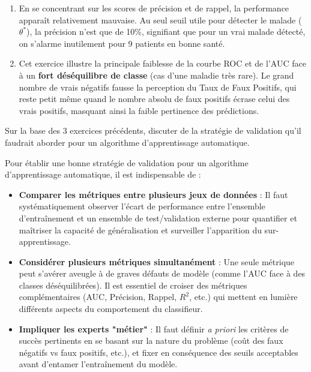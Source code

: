 \documentclass[]{../exercices}
\begin{document}
\begin{solution}
\begin{enumerate}
		\item En se concentrant sur les scores de précision et de rappel, la performance apparaît relativement mauvaise. Au seul seuil utile pour détecter le malade ($\theta^*$), la précision n'est que de 10\%, signifiant que pour un vrai malade détecté, on s'alarme inutilement pour 9 patients en bonne santé.

		\item Cet exercice illustre la principale faiblesse de la courbe ROC et de l'AUC face à un \textbf{fort déséquilibre de classe} (cas d'une maladie très rare). Le grand nombre de vrais négatifs fausse la perception du Taux de Faux Positifs, qui reste petit même quand le nombre absolu de faux positifs écrase celui des vrais positifs, masquant ainsi la faible pertinence des prédictions.
	\end{enumerate}
\end{solution}

	\begin{exercice}
		Sur la base des 3 exercices précédents, discuter de la stratégie de validation qu'il faudrait aborder pour un algorithme d'apprentissage automatique.
	\end{exercice}

\begin{solution}
	Pour établir une bonne stratégie de validation pour un algorithme d'apprentissage automatique, il est indispensable de :
	\begin{itemize}
		\item \textbf{Comparer les métriques entre plusieurs jeux de données} : Il faut systématiquement observer l'écart de performance entre l'ensemble d'entraînement et un ensemble de test/validation externe pour quantifier et maîtriser la capacité de généralisation et surveiller l'apparition du sur-apprentissage.
		\item \textbf{Considérer plusieurs métriques simultanément} : Une seule métrique peut s'avérer aveugle à de graves défauts de modèle (comme l'AUC face à des classes déséquilibrées). Il est essentiel de croiser des métriques complémentaires (AUC, Précision, Rappel, $R^2$, etc.) qui mettent en lumière différents aspects du comportement du classifieur.
		\item \textbf{Impliquer les experts "métier"} : Il faut définir \textit{a priori} les critères de succès pertinents en se basant sur la nature du problème (coût des faux négatifs vs faux positifs, etc.), et fixer en conséquence des seuils acceptables avant d'entamer l'entraînement du modèle.
	\end{itemize}
\end{solution}
\end{document}

